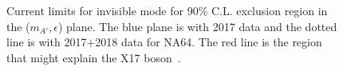 \begin{figure}[t!]
\begin{minipage}[t]{.45\textwidth}
    \caption{Current limits for invisible mode for 90\% C.L. exclusion region in the ($m_{A'},\epsilon$) plane. The blue plane is with 2017 data and the dotted line is with 2017+2018 data for NA64. The red line is the region that might explain the X17 boson~\cite{2019EPJWC.21206005K}.}
    \label{fig:exclusion_visible}
  \end{minipage}
\end{figure}


